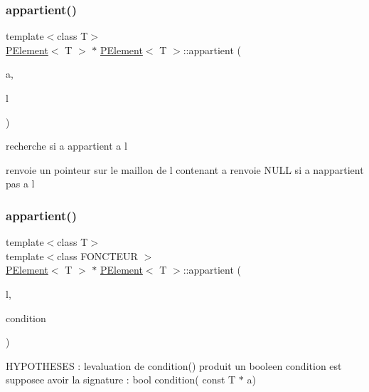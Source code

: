 \subsubsection{\texorpdfstring{appartient()}{appartient()}\hspace{0.1cm}{\footnotesize\ttfamily [1/2]}}
{\footnotesize\ttfamily template$<$class T$>$ \\
\mbox{\hyperlink{class_p_element}{P\+Element}}$<$ T $>$ $\ast$ \mbox{\hyperlink{class_p_element}{P\+Element}}$<$ T $>$\+::appartient (\begin{DoxyParamCaption}\item[{const T $\ast$}]{a,  }\item[{\mbox{\hyperlink{class_p_element}{P\+Element}}$<$ T $>$ $\ast$}]{l }\end{DoxyParamCaption})\hspace{0.3cm}{\ttfamily [static]}}



recherche si a appartient a l 

renvoie un pointeur sur le maillon de l contenant a renvoie N\+U\+LL si a n\textquotesingle{}appartient pas a l \mbox{\label{class_p_element_ad1ad40db30605db39a57c08058cf444c}} 
\subsubsection{\texorpdfstring{appartient()}{appartient()}\hspace{0.1cm}{\footnotesize\ttfamily [2/2]}}
{\footnotesize\ttfamily template$<$class T$>$ \\
template$<$class F\+O\+N\+C\+T\+E\+UR $>$ \\
\mbox{\hyperlink{class_p_element}{P\+Element}}$<$ T $>$ $\ast$ \mbox{\hyperlink{class_p_element}{P\+Element}}$<$ T $>$\+::appartient (\begin{DoxyParamCaption}\item[{\mbox{\hyperlink{class_p_element}{P\+Element}}$<$ T $>$ $\ast$}]{l,  }\item[{const F\+O\+N\+C\+T\+E\+UR \&}]{condition }\end{DoxyParamCaption})\hspace{0.3cm}{\ttfamily [static]}}



H\+Y\+P\+O\+T\+H\+E\+S\+ES \+: l\textquotesingle{}evaluation de condition() produit un booleen condition est supposee avoir la signature \+: bool condition( const T $\ast$ a) 

